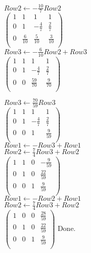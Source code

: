 \documentclass[10pt,fullpage]{article}
\begin{document}
$ Row2 \leftarrow -\frac{10}{7}Row2$\\
$\left(%
\begin{array}{cccc}
  1 & 1 & 1 & 1 \\
  0 & 1 & -\frac{4}{7} & \frac{2}{7} \\
  0 & \frac{6}{10} & \frac{5}{10} & \frac{3}{10} \\
 \end{array}%
\right)$\\



$ Row3 \leftarrow -\frac{6}{10}Row2 + Row3$\\
$\left(%
\begin{array}{cccc}
  1 & 1 & 1 & 1 \\
  0 & 1 & -\frac{4}{7} & \frac{2}{7} \\
  0 & 0 & \frac{59}{70} & \frac{9}{70} \\
 \end{array}%
\right)$\\

\newpage

$ Row3 \leftarrow \frac{70}{59}Row3$\\
$\left(%
\begin{array}{cccc}
  1 & 1 & 1 & 1 \\
  0 & 1 & -\frac{4}{7} & \frac{2}{7} \\
  0 & 0 & 1 & \frac{9}{59} \\
 \end{array}%
\right)$\\


$ Row1 \leftarrow -Row3 + Row1$\\
$ Row2 \leftarrow \frac{7}{4}Row3 + Row2$\\
$\left(%
\begin{array}{cccc}
  1 & 1 & 0 & -\frac{9}{59} \\
  0 & 1 & 0 & \frac{22}{59} \\
  0 & 0 & 1 & \frac{9}{59} \\
 \end{array}%
\right)$\\


$ Row1 \leftarrow -Row2 + Row1$\\
$ Row2 \leftarrow \frac{7}{4}Row3 + Row2$\\
$\left(%
\begin{array}{cccc}
  1 & 0 & 0 & \frac{28}{59} \\
  0 & 1 & 0 & \frac{22}{59} \\
  0 & 0 & 1 & \frac{9}{59} \\
 \end{array}%
\right)$    Done. \\
\end{document}
